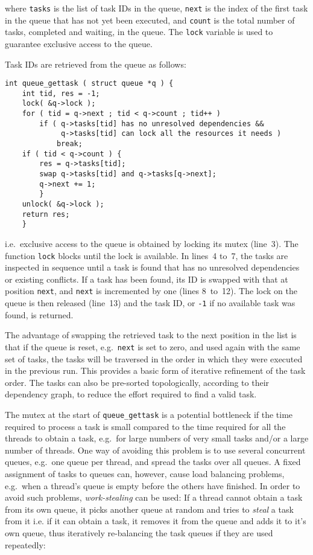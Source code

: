 \documentclass[final]{siamltex}
\begin{document}
\noindent where {\tt tasks} is the list of task IDs in the queue, {\tt next}
is the index of the first task in the queue that has not yet been executed,
and {\tt count} is the total number of tasks, completed and waiting,
in the queue.
The {\tt lock} variable is used to guarantee exclusive access
to the queue.

Task IDs are retrieved from the queue as follows:        

\begin{center}\begin{minipage}{0.8\textwidth}
    \begin{lstlisting}
int queue_gettask ( struct queue *q ) {
    int tid, res = -1;
    lock( &q->lock );
    for ( tid = q->next ; tid < q->count ; tid++ )
        if ( q->tasks[tid] has no unresolved dependencies &&
             q->tasks[tid] can lock all the resources it needs )
            break;
    if ( tid < q->count ) {
        res = q->tasks[tid];
        swap q->tasks[tid] and q->tasks[q->next];
        q->next += 1;
        }
    unlock( &q->lock );
    return res;
    }
    \end{lstlisting}
\end{minipage}\end{center}

\noindent i.e.~exclusive access to the queue is obtained by locking
its mutex (line~3).
The function {\tt lock} blocks until the lock is available.
In lines~4 to~7, the tasks are inspected
in sequence until a task is found that has no unresolved
dependencies or existing conflicts.
If a task has been found, its ID is swapped with that at
position {\tt next}, and {\tt next} is incremented by one
(lines 8~to~12).
The lock on the queue is then released (line~13) and
the task ID, or {\tt -1} if no available task was found, is
returned.

The advantage of swapping the retrieved task to the next
position in the list is that if the queue is reset, e.g.~{\tt next}
is set to zero, and used again with the same set of tasks,
the tasks will be traversed in the order in which they were
executed in the previous run.
This provides a basic form of iterative refinement of the task
order.
The tasks can also be pre-sorted topologically, according to their
dependency graph, to reduce the effort required to find
a valid task.

The mutex at the start of {\tt queue\_gettask} is a potential
bottleneck if the time required to process a task is small
compared to the time required for all the threads to obtain
a task, e.g.~for large numbers of very small tasks and/or
a large number of threads.
One way of avoiding this problem is to use several concurrent
queues, e.g.~one queue per thread, and spread the tasks over
all queues.
A fixed assignment of tasks to queues can, however,
cause load balancing problems, e.g.~when a thread's queue is
empty before the others have finished.
In order to avoid such problems, {\em work-stealing}
\cite{ref:Blumofe1999} can be used:
If a thread cannot obtain a task from its own queue, it picks
another queue at random and tries to {\em steal} a task from it
i.e. if it can obtain a task, it removes it from the queue and
adds it to it's own queue, thus iteratively re-balancing
the task queues if they are used repeatedly:
\end{document}
